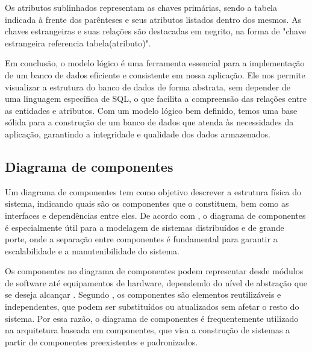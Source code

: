 \documentclass[tcc,capa]{texufpel}
\begin{document}
Os atributos sublinhados representam as chaves primárias, sendo a tabela indicada à frente dos parênteses e seus atributos listados dentro dos mesmos. As chaves estrangeiras e suas relações são destacadas em negrito, na forma de "chave estrangeira referencia tabela(atributo)".

Em conclusão, o modelo lógico é uma ferramenta essencial para a implementação de um banco de dados eficiente e consistente em nossa aplicação. Ele nos permite visualizar a estrutura do banco de dados de forma abstrata, sem depender de uma linguagem específica de SQL, o que facilita a compreensão das relações entre as entidades e atributos. Com um modelo lógico bem definido, temos uma base sólida para a construção de um banco de dados que atenda às necessidades da aplicação, garantindo a integridade e qualidade dos dados armazenados.

\subsection{Diagrama de componentes}
Um diagrama de componentes tem como objetivo descrever a estrutura física do sistema, indicando quais são os componentes que o constituem, bem como as interfaces e dependências entre eles. De acordo com \citet{LARMAN:2011}, o diagrama de componentes é especialmente útil para a modelagem de sistemas distribuídos e de grande porte, onde a separação entre componentes é fundamental para garantir a escalabilidade e a manutenibilidade do sistema.

Os componentes no diagrama de componentes podem representar desde módulos de software até equipamentos de hardware, dependendo do nível de abstração que se deseja alcançar \cite{OMG:2017}. Segundo \citet{LARMAN:2011}, os componentes são elementos reutilizáveis e independentes, que podem ser substituídos ou atualizados sem afetar o resto do sistema. Por essa razão, o diagrama de componentes é frequentemente utilizado na arquitetura baseada em componentes, que visa a construção de sistemas a partir de componentes preexistentes e padronizados.
\end{document}
